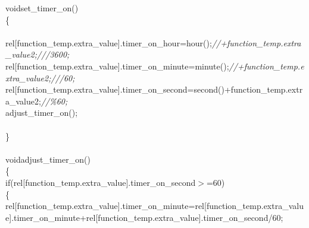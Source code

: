 \documentclass[a4paper, 12pt]{article}
\newcommand\SPC{\hspace*{0.6em}}
\newcommand{\CppAComment}[1]{\textit{\textcolor[rgb]{0.2,0.4,1}{#1}}}
\newcommand{\CppAIdentifier}[1]{\textcolor[rgb]{0,1,0}{#1}}
\newcommand{\CppANumber}[1]{\textcolor[rgb]{0,0,1}{#1}}
\newcommand{\CppAReservedWord}[1]{\textcolor[rgb]{0,0.5,0}{#1}}
\newcommand{\CppASpace}[1]{\textcolor[rgb]{1,1,1}{\colorbox[rgb]{0,0,0}{#1}}}
\newcommand{\CppASymbol}[1]{\textcolor[rgb]{1,0,0}{#1}}
\begin{document}
\begin{ttfamily}
\CppAReservedWord{void}\CppASpace{\SPC }\CppAIdentifier{set\_timer\_on}\CppASymbol{(}\CppASymbol{)}\\
\CppASymbol{\{}\\
\\
\CppASpace{\SPC \SPC }\CppAIdentifier{rel}\CppASymbol{[}\CppAIdentifier{function\_temp}\CppASymbol{.}\CppAIdentifier{extra\_value}\CppASymbol{]}\CppASymbol{.}\CppAIdentifier{timer\_on\_hour}\CppASpace{\SPC }\CppASymbol{=}\CppASpace{\SPC }\CppAIdentifier{hour}\CppASymbol{(}\CppASymbol{)}\CppASymbol{;}\CppAComment{//+function\_temp.extra\_value2;///3600;}\\
\CppASpace{\SPC \SPC }\CppAIdentifier{rel}\CppASymbol{[}\CppAIdentifier{function\_temp}\CppASymbol{.}\CppAIdentifier{extra\_value}\CppASymbol{]}\CppASymbol{.}\CppAIdentifier{timer\_on\_minute}\CppASpace{\SPC }\CppASymbol{=}\CppASpace{\SPC }\CppAIdentifier{minute}\CppASymbol{(}\CppASymbol{)}\CppASymbol{;}\CppAComment{//+function\_temp.extra\_value2;///60;}\\
\CppASpace{\SPC \SPC }\CppAIdentifier{rel}\CppASymbol{[}\CppAIdentifier{function\_temp}\CppASymbol{.}\CppAIdentifier{extra\_value}\CppASymbol{]}\CppASymbol{.}\CppAIdentifier{timer\_on\_second}\CppASpace{\SPC }\CppASymbol{=}\CppASpace{\SPC }\CppAIdentifier{second}\CppASymbol{(}\CppASymbol{)}\CppASymbol{+}\CppAIdentifier{function\_temp}\CppASymbol{.}\CppAIdentifier{extra\_value2}\CppASpace{\SPC }\CppASymbol{;}\CppAComment{//\%60;}\\
\CppASpace{\SPC \SPC }\CppAIdentifier{adjust\_timer\_on}\CppASymbol{(}\CppASymbol{)}\CppASymbol{;}\\
\CppASpace{\SPC \SPC \SPC \SPC \SPC \SPC \SPC \SPC \SPC \SPC \SPC \SPC \SPC \SPC }\\
\CppASymbol{\}}\\
\\
\CppAReservedWord{void}\CppASpace{\SPC }\CppAIdentifier{adjust\_timer\_on}\CppASymbol{(}\CppASymbol{)}\\
\CppASymbol{\{}\CppASpace{\SPC }\\
\CppASpace{\SPC \SPC }\CppAReservedWord{if}\CppASymbol{(}\CppAIdentifier{rel}\CppASymbol{[}\CppAIdentifier{function\_temp}\CppASymbol{.}\CppAIdentifier{extra\_value}\CppASymbol{]}\CppASymbol{.}\CppAIdentifier{timer\_on\_second}\CppASpace{\SPC }\CppASymbol{$>$=}\CppASpace{\SPC }\CppANumber{60}\CppASymbol{)}\\
\CppASpace{\SPC \SPC }\CppASymbol{\{}\CppASpace{\SPC \SPC }\\
\CppASpace{\SPC \SPC \SPC }\CppAIdentifier{rel}\CppASymbol{[}\CppAIdentifier{function\_temp}\CppASymbol{.}\CppAIdentifier{extra\_value}\CppASymbol{]}\CppASymbol{.}\CppAIdentifier{timer\_on\_minute}\CppASpace{\SPC \SPC }\CppASymbol{=}\CppASpace{\SPC }\CppAIdentifier{rel}\CppASymbol{[}\CppAIdentifier{function\_temp}\CppASymbol{.}\CppAIdentifier{extra\_value}\CppASymbol{]}\CppASymbol{.}\CppAIdentifier{timer\_on\_minute}\CppASpace{\SPC }\CppASymbol{+}\CppASpace{\SPC }\CppAIdentifier{rel}\CppASymbol{[}\CppAIdentifier{function\_temp}\CppASymbol{.}\CppAIdentifier{extra\_value}\CppASymbol{]}\CppASymbol{.}\CppAIdentifier{timer\_on\_second}\CppASpace{\SPC }\CppASymbol{/}\CppASpace{\SPC }\CppANumber{60}\CppASymbol{;}\\

\end{ttfamily}
\end{document}
